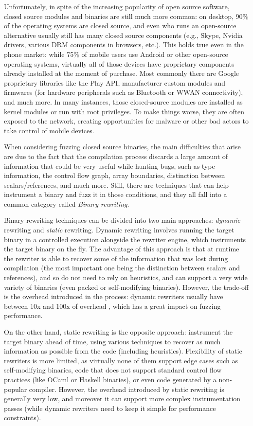 \documentclass[a4paper,11pt,oneside]{report}
\begin{document}
Unfortunately, in spite of the increasing popularity of open source software, 
closed source modules and binaries are still much more common: on desktop, 90\% 
of the operating systems are closed source, and even who runs an open-source 
alternative usually still has many closed source components (e.g., Skype, 
Nvidia drivers, various DRM components in browsers, etc.). This holds true even 
in the phone market: while 75\% \cite{statista} of mobile users use Android or 
other open-source operating systems, virtually all of those devices have 
proprietary components already installed at the moment of purchase. Most 
commonly there are Google proprietary libraries like the Play API, manufacturer 
custom modules and firmwares (for hardware peripherals such as Bluetooth or 
WWAN connectivity), and much more. In many instances, those closed-source 
modules are installed as kernel modules or run with root privileges. To make 
things worse, they are often exposed to the network, creating opportunities for 
malware or other bad actors to take control of mobile devices.

When considering fuzzing closed source binaries, the main difficulties that 
arise are due to the fact that the compilation process discards a large amount 
of information that could be very useful while hunting bugs, such as type 
information, the control flow graph, array boundaries, distinction between 
scalars/references, and much more.  Still, there are techniques that can help 
instrument a binary and fuzz it in those conditions, and they all fall into a 
common category called \emph{Binary rewriting}.

Binary rewriting techniques can be divided into two main approaches: 
\emph{dynamic} rewriting and \emph{static} rewriting. Dynamic rewriting 
involves running the target binary in a controlled execution alongside the 
rewriter engine, which instruments the target binary on the fly. The advantage 
of this approach is that at runtime the rewriter is able to recover some of the 
information that was lost during compilation (the most important one being the 
distinction between scalars and references), and so do not need to rely on 
heuristics, and can support a very wide variety of binaries (even packed or 
self-modifying binaries). However, the trade-off is the overhead introduced in 
the process: dynamic rewriters usually have between 10x and 100x of overhead 
\cite{dinesh20oakland}, which has a great impact on fuzzing performance. 

On the other hand, static rewriting is the opposite approach: instrument the 
target binary ahead of time, using various techniques to recover as much 
information as possible from the code (including heuristics). Flexibility of 
static rewriters is more limited, as virtually none of them support edge cases 
such as self-modifying binaries, code that does not support standard control 
flow practices (like OCaml or Haskell binaries), or even code generated by a 
non-popular compiler. However, the overhead introduced by static rewriting is 
generally very low, and moreover it can support more complex instrumentation 
passes (while dynamic rewriters need to keep it simple for performance 
constraints). 
\end{document}
